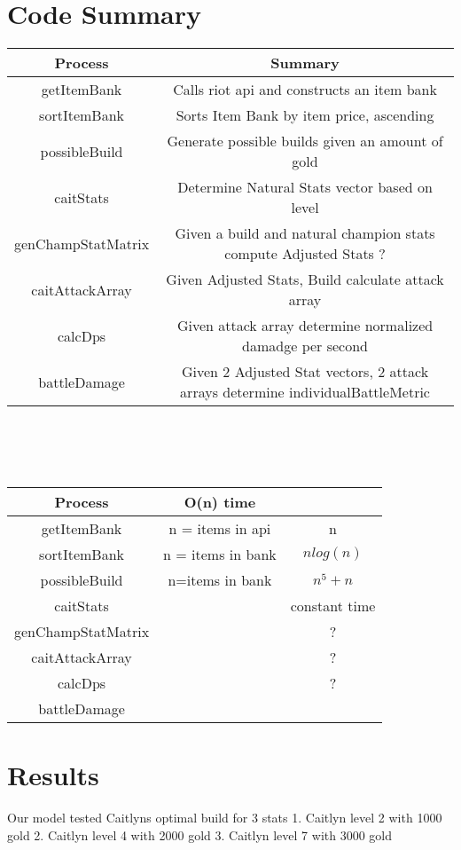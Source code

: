 \documentclass{article}
\begin{document}
\section{Code Summary}
\begin{tabular}{|c|c|}\hline
Process& Summary\\  \hline
getItemBank& Calls riot api and constructs an item bank  \\ \hline
sortItemBank & Sorts Item Bank by item price, ascending\\ \hline
possibleBuild& Generate possible builds given an amount of gold\\  \hline
caitStats & Determine Natural Stats vector based on level \\ \hline
genChampStatMatrix & Given a build and natural champion stats compute Adjusted Stats ? \\ \hline
caitAttackArray & Given Adjusted Stats, Build calculate attack array  \\ \hline
calcDps& Given attack array determine normalized damadge per second \\ \hline
battleDamage & Given 2 Adjusted Stat vectors, 2 attack arrays determine individualBattleMetric\\ \hline
\end{tabular}\\\\\\
\begin{tabular}{|c|c|c|} \hline
Process& O(n) time &\\  \hline
getItemBank& n = items in api & n  \\ \hline
sortItemBank & n = items in bank & $nlog(n)$ \\ \hline
possibleBuild& n=items in bank & $n^5 + n$\\  \hline
caitStats  &  & constant time\\ \hline
genChampStatMatrix &  &? \\ \hline
caitAttackArray  & &? \\ \hline
calcDps&  &? \\ \hline
battleDamage & &\\ \hline
\end{tabular}

\newpage
\section{Results}
Our model tested Caitlyns optimal build for 3 stats
1. Caitlyn level 2 with 1000 gold
2. Caitlyn level 4 with 2000 gold
3. Caitlyn level 7 with 3000 gold
\newpage
\end{document}

